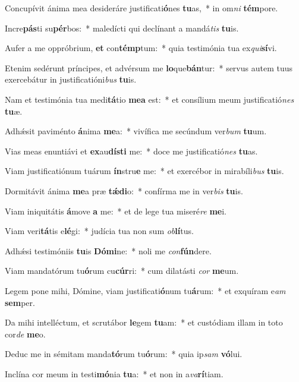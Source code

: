 \item Concupívit ánima mea desideráre justificati\textbf{ó}nes \textbf{tu}as,~* in om\textit{ni} \textbf{tém}pore.
\item Incre\textbf{pás}ti su\textbf{pér}bos:~* maledícti qui declínant a mandá\textit{tis} \textbf{tu}is.
\item Aufer a me oppróbrium, \textbf{et} con\textbf{témp}tum:~* quia testimónia tua ex\textit{qui}\textbf{sí}vi.
\item Etenim sedérunt príncipes, et advérsum me \textbf{lo}que\textbf{bán}tur:~* servus autem tuus exercebátur in justificatióni\textit{bus} \textbf{tu}is.
\item Nam et testimónia tua medi\textbf{tá}tio \textbf{me}\textbf{a} est:~* et consílium meum justificatió\textit{nes} \textbf{tu}æ.
\item Adhǽsit paviménto \textbf{á}nima \textbf{me}a:~* vivífica me secúndum ver\textit{bum} \textbf{tu}um.
\item Vias meas enuntiávi et \textbf{ex}au\textbf{dís}\textbf{ti} me:~* doce me justificatió\textit{nes} \textbf{tu}as.
\item Viam justificatiónum tuárum \textbf{ín}stru\textbf{e} me:~* et exercébor in mirabíli\textit{bus} \textbf{tu}is.
\item Dormitávit ánima \textbf{me}a præ \textbf{tǽ}\textbf{di}o:~* confírma me in ver\textit{bis} \textbf{tu}is.
\item Viam iniquitátis \textbf{á}move \textbf{a} me:~* et de lege tua miseré\textit{re} \textbf{me}i.
\item Viam veri\textbf{tá}tis e\textbf{lé}gi:~* judícia tua non sum \textit{ob}\textbf{lí}tus.
\item Adhǽsi testimóniis \textbf{tu}is \textbf{Dó}\textbf{mi}ne:~* noli me \textit{con}\textbf{fún}dere.
\item Viam mandatórum tu\textbf{ó}rum cu\textbf{cúr}ri:~* cum dilatásti \textit{cor} \textbf{me}um.
\item Legem pone mihi, Dómine, viam justificati\textbf{ó}num tu\textbf{á}rum:~* et exquíram e\textit{am} \textbf{sem}per.
\item Da mihi intelléctum, et scrutábor \textbf{le}gem \textbf{tu}am:~* et custódiam illam in toto cor\textit{de} \textbf{me}o.
\item Deduc me in sémitam manda\textbf{tó}rum tu\textbf{ó}rum:~* quia ip\textit{sam} \textbf{vó}lui.
\item Inclína cor meum in testi\textbf{mó}nia \textbf{tu}a:~* et non in a\textit{va}\textbf{rí}tiam.
